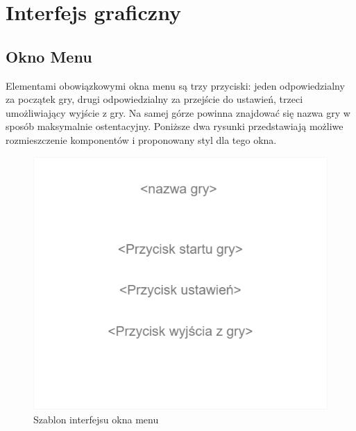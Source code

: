 \documentclass[11pt,a4paper]{report}
\begin{document}
\newpage
\section{Interfejs graficzny}

\subsection{Okno Menu}
Elementami obowiązkowymi okna menu są trzy przyciski: jeden odpowiedzialny za początek gry, drugi odpowiedzialny za przejście do ustawień, trzeci umożliwiający wyjście z gry. Na samej górze powinna znajdować się nazwa gry w sposób maksymalnie ostentacyjny. Poniższe dwa rysunki przedstawiają możliwe rozmieszczenie komponentów i proponowany styl dla tego okna.
\begin{figure}[!ht]
\centerline{\includegraphics{img/menu1.png}}
\caption{Szablon interfejsu okna menu}
\end{figure}
\newpage
\end{document}
